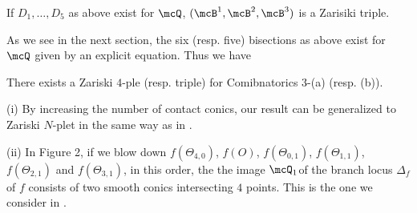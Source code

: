 \begin{prop}\label{prop:z-triple}{If $D_1, \ldots, D_5$ as above exist for 
$\mcQ$, $(\mcB^1, \mcB^2, \mcB^3)$  is a Zarisiki triple.
}
\end{prop}



As we see in the next section, the six (resp. five) bisections as above exist for $\mcQ$ given
by an explicit equation. Thus we have

\begin{thm}\label{thm:z-tri-quar}{
 There exists a Zariski $4$-ple (resp. triple) for Comibnatorics 3-(a) (resp. (b)). 

%
%
%

}
\end{thm}


\begin{rem} {\rm (i) By increasing  the number of contact conics, our result can be generalized to
Zariski $N$-plet in the same way as in \cite{bannai-tokunaga}.

(ii) In Figure 2,  if we blow down $f(\Theta_{4,0})$, $f(O)$, $f(\Theta_{0,1})$, 
 $f(\Theta_{1,1})$,  $f(\Theta_{2,1})$ and $f(\Theta_{3,1})$, in this order, the the image 
 $\mcQ_1$of
 the branch locus $\Delta_f$ of $f$ consists of two smooth conics intersecting $4$ points. This 
 is the one we consider in \cite[Theorem1]{bannai-tokunaga}.

}
\end{rem}


